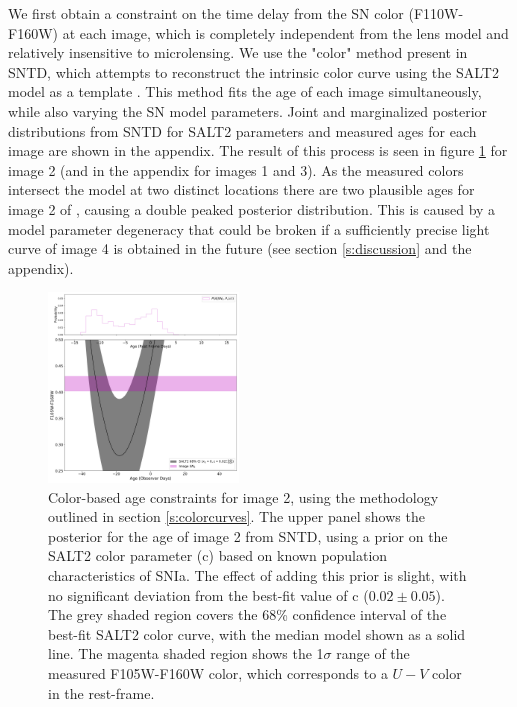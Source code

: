 \documentclass[twocolumn]{aastex63}
\begin{document}
We first obtain a constraint on the time delay from the SN color (F110W-F160W) at each image, which is completely independent from the lens model and relatively insensitive to microlensing. We use the "color" method present in SNTD, which attempts to reconstruct the intrinsic color curve using the SALT2 model as a template \citep{guy_salt2:_2007}. This method fits the age of each image simultaneously, while also varying the SN model parameters. Joint and marginalized posterior distributions
from SNTD for SALT2 parameters and measured ages for each image are shown in the appendix. The result of this process is seen in figure \ref{fig:colorcurve2} for image 2 (and in the appendix for images 1 and 3).  As the measured colors intersect the model at two distinct locations there are two plausible ages for image 2 of \SNABC, causing a double peaked posterior distribution. This is caused by a model parameter degeneracy that could be broken if a sufficiently precise light curve of image 4 is obtained in the future (see section \ref{s:discussion} and the appendix).



\begin{figure}
    \centering
    \includegraphics[width=0.45\textwidth]{Images/colorcurve_image2.pdf}
    \caption{Color-based age constraints for \SNABC image 2, using the methodology outlined in section \ref{s:colorcurves}. The upper panel shows the posterior for the age of image 2 from SNTD, using a prior on the SALT2 color parameter (c) based on known population characteristics of SNIa. The effect of adding this prior is slight, with no significant deviation from the best-fit value of c ($0.02\pm0.05$). The grey shaded region covers the 68\% confidence interval of the best-fit SALT2 color curve, with the median model shown as a solid line. The magenta shaded region shows the 1$\sigma$ range of the measured F105W-F160W color, which corresponds to a $U-V$ color in the rest-frame.}
    \label{fig:colorcurve2}
\end{figure}
\end{document}

